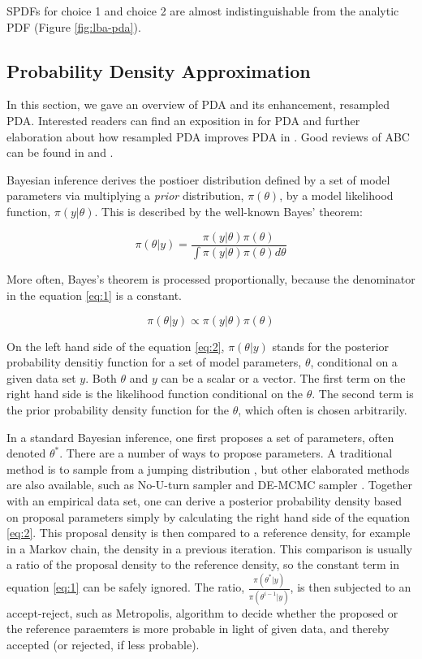 \documentclass[shortnames,nojss,article]{jss}
\begin{document}
SPDFs for choice 1 and choice 2 are almost indistinguishable from the analytic 
PDF (Figure \ref{fig:lba-pda}).


\subsection{Probability Density Approximation}
In this section, we gave an overview of PDA and its
enhancement, resampled PDA.  Interested readers can find an exposition in
\cite{turner_generalized_2014} for PDA and further elaboration about how
resampled PDA improves PDA in \cite{holmes_practical_2015}. Good reviews of ABC
can be found in \cite{sisson_likelihood_2010} and \cite{beaumont_approximate_2010}.

Bayesian inference derives the postioer distribution defined by a set of model
parameters via multiplying a \textit{prior} distribution, $\pi(\theta)$, by a
model likelihood function, $\pi(y|\theta)$. This is described by the
well-known Bayes' theorem:

\begin{equation} \label{eq:1}
\pi(\theta|y)=\frac{\pi(y|\theta)\pi(\theta)}{\int{\pi(y|\theta)\pi(\theta)d\theta}}
\end{equation}

More often, Bayes's theorem is processed proportionally, because the denominator
in the equation \ref{eq:1} is a constant.

\begin{equation} \label{eq:2}
\pi(\theta|y) \propto \pi(y|\theta)\pi(\theta)
\end{equation}

On the left hand side of the equation \ref{eq:2}, $\pi(\theta|y)$ stands for
the posterior probability densitiy function for a set of model parameters,
$\theta$, conditional on a given data set $y$. Both $\theta$ and $y$ can be a
scalar or a vector. The first term on the right hand side is
the likelihood function conditional on
the $\theta$. The second term is the prior probability density function for the
$\theta$, which often is chosen arbitrarily.

In a standard Bayesian inference, one first proposes a set of
parameters, often denoted $\theta^{*}$. There are a number of ways to propose parameters. A
traditional method is to sample from a jumping distribution
\citep{gelman_bayesian_2014}, but other elaborated methods are also available, such as
No-U-turn sampler \citep{hoffman2014_nut} and DE-MCMC sampler 
\citep{Braak2006,Turner2013}.  Together with an
empirical data set, one can derive a posterior probability density based on
proposal parameters simply by calculating the right hand side of the equation
\ref{eq:2}.  This proposal density is then compared to a reference
density, for example in a Markov chain, the density in a previous iteration.  This
comparison is usually a ratio of the proposal density to the reference
density, so the constant term in equation \ref{eq:1} can be safely ignored.
The ratio, $\frac{\pi(\theta^{*}|y)}{\pi(\theta^{i-1}|y)}$, is then subjected
to an accept-reject, such as Metropolis, algorithm to
decide whether the proposed or the reference paraemters is more probable in
light of given data, and thereby accepted (or rejected, if less probable).
\end{document}
